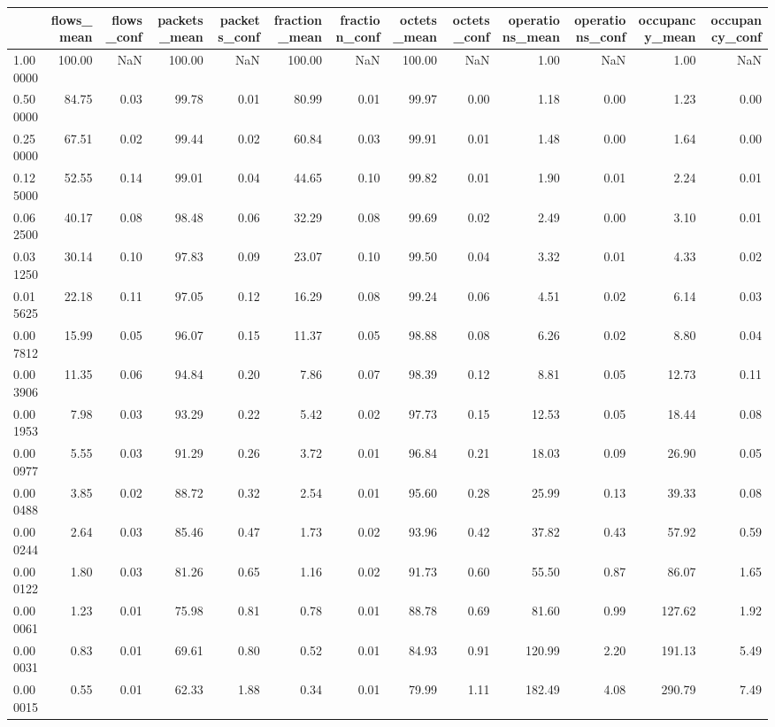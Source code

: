 \begin{tabular}{lrrrrrrrrrrrr}
\toprule
 & flows_mean & flows_conf & packets_mean & packets_conf & fraction_mean & fraction_conf & octets_mean & octets_conf & operations_mean & operations_conf & occupancy_mean & occupancy_conf \\
\midrule
1.000000 & 100.00 & NaN & 100.00 & NaN & 100.00 & NaN & 100.00 & NaN & 1.00 & NaN & 1.00 & NaN \\
0.500000 & 84.75 & 0.03 & 99.78 & 0.01 & 80.99 & 0.01 & 99.97 & 0.00 & 1.18 & 0.00 & 1.23 & 0.00 \\
0.250000 & 67.51 & 0.02 & 99.44 & 0.02 & 60.84 & 0.03 & 99.91 & 0.01 & 1.48 & 0.00 & 1.64 & 0.00 \\
0.125000 & 52.55 & 0.14 & 99.01 & 0.04 & 44.65 & 0.10 & 99.82 & 0.01 & 1.90 & 0.01 & 2.24 & 0.01 \\
0.062500 & 40.17 & 0.08 & 98.48 & 0.06 & 32.29 & 0.08 & 99.69 & 0.02 & 2.49 & 0.00 & 3.10 & 0.01 \\
0.031250 & 30.14 & 0.10 & 97.83 & 0.09 & 23.07 & 0.10 & 99.50 & 0.04 & 3.32 & 0.01 & 4.33 & 0.02 \\
0.015625 & 22.18 & 0.11 & 97.05 & 0.12 & 16.29 & 0.08 & 99.24 & 0.06 & 4.51 & 0.02 & 6.14 & 0.03 \\
0.007812 & 15.99 & 0.05 & 96.07 & 0.15 & 11.37 & 0.05 & 98.88 & 0.08 & 6.26 & 0.02 & 8.80 & 0.04 \\
0.003906 & 11.35 & 0.06 & 94.84 & 0.20 & 7.86 & 0.07 & 98.39 & 0.12 & 8.81 & 0.05 & 12.73 & 0.11 \\
0.001953 & 7.98 & 0.03 & 93.29 & 0.22 & 5.42 & 0.02 & 97.73 & 0.15 & 12.53 & 0.05 & 18.44 & 0.08 \\
0.000977 & 5.55 & 0.03 & 91.29 & 0.26 & 3.72 & 0.01 & 96.84 & 0.21 & 18.03 & 0.09 & 26.90 & 0.05 \\
0.000488 & 3.85 & 0.02 & 88.72 & 0.32 & 2.54 & 0.01 & 95.60 & 0.28 & 25.99 & 0.13 & 39.33 & 0.08 \\
0.000244 & 2.64 & 0.03 & 85.46 & 0.47 & 1.73 & 0.02 & 93.96 & 0.42 & 37.82 & 0.43 & 57.92 & 0.59 \\
0.000122 & 1.80 & 0.03 & 81.26 & 0.65 & 1.16 & 0.02 & 91.73 & 0.60 & 55.50 & 0.87 & 86.07 & 1.65 \\
0.000061 & 1.23 & 0.01 & 75.98 & 0.81 & 0.78 & 0.01 & 88.78 & 0.69 & 81.60 & 0.99 & 127.62 & 1.92 \\
0.000031 & 0.83 & 0.01 & 69.61 & 0.80 & 0.52 & 0.01 & 84.93 & 0.91 & 120.99 & 2.20 & 191.13 & 5.49 \\
0.000015 & 0.55 & 0.01 & 62.33 & 1.88 & 0.34 & 0.01 & 79.99 & 1.11 & 182.49 & 4.08 & 290.79 & 7.49 \\

\end{tabular}
